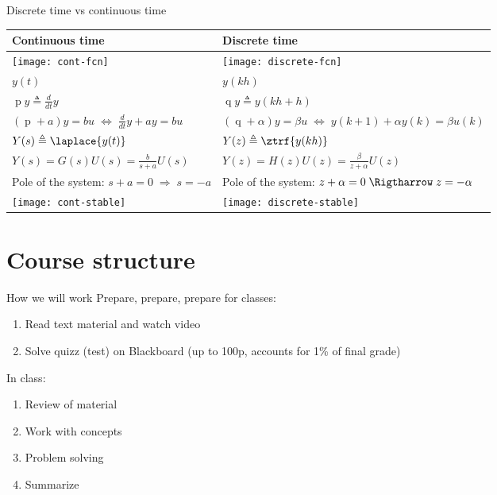 \documentclass[presentation,aspectratio=169]{beamer}
\begin{document}
\begin{frame}[label=sec-4-3]{Discrete time vs continuous time}
\begin{center}
\begin{tabular}{ll}
Continuous time & Discrete time\\
\hline
\texttt{[image: cont-fcn]} & \texttt{[image: discrete-fcn]}\\
\(y(t)\) & \(y(kh)\)\\
\(\operatorname{p} y \triangleq \frac{d}{dt} y\) & \(\operatorname{q}y \triangleq y(kh+h)\)\\
\( (\operatorname{p}+a) y = bu \;\Leftrightarrow\; \frac{d}{dt}y + ay = bu\) & \( (\operatorname{q} + \alpha) y = \beta u \; \Leftrightarrow \; y(k+1) + \alpha y(k) = \beta u(k)\)\\
\(Y(s) \triangleq \laplace{y(t)}\) & \(Y(z) \triangleq \ztrf{y(kh)}\)\\
\( Y(s) = G(s)U(s) = \frac{b}{s+a}U(s)\) & \(Y(z) = H(z)U(z) = \frac{\beta}{z+\alpha}U(z)\)\\
Pole of the system: \(s+a=0 \; \Rightarrow \; s = -a\) & Pole of the system: \( z+\alpha = 0 \; \Rigtharrow \; z = -\alpha \)\\
\texttt{[image: cont-stable]} & \texttt{[image: discrete-stable]}\\
\hline
\end{tabular}
\end{center}
\end{frame}

\section{Course structure}
\label{sec-5}
\begin{frame}[label=sec-5-1]{How we will work}
\alert{Prepare, prepare, prepare} for classes:
\begin{enumerate}
\item Read text material and watch video
\item Solve quizz (test) on Blackboard (up to 100p, accounts for 1\% of final grade)
\end{enumerate}
In class:
\begin{enumerate}
\item Review of material
\item Work with concepts
\item Problem solving
\item Summarize
\end{enumerate}
\end{frame}
\end{document}
